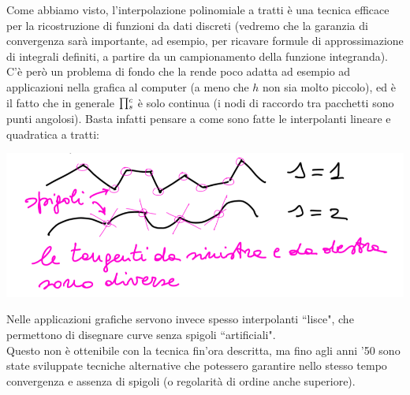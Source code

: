 Come abbiamo visto, l'interpolazione polinomiale a tratti è una tecnica efficace per la ricostruzione di funzioni da dati discreti (vedremo che la garanzia di convergenza sarà importante, ad esempio, per ricavare formule di approssimazione di integrali definiti, a partire da un campionamento della funzione integranda).\\
C'è però un problema di fondo che la rende poco adatta ad esempio ad applicazioni nella grafica al computer (a meno che $h$ non sia molto piccolo), ed è il fatto che in generale $\begin{matrix}\prod\end{matrix}_s^c$ è solo continua (i nodi di raccordo tra pacchetti sono punti angolosi). Basta infatti pensare a come sono fatte le interpolanti lineare e quadratica a tratti:
\begin{center}
    \includegraphics[scale=0.4]{foto/img_pag18}
\end{center}
Nelle applicazioni grafiche servono invece spesso interpolanti ``lisce", che permettono di disegnare curve senza spigoli ``artificiali".\\
Questo non è ottenibile con la tecnica fin'ora descritta, ma fino agli anni '50 sono state sviluppate tecniche alternative che potessero garantire nello stesso tempo convergenza e assenza di spigoli (o regolarità di ordine anche superiore).

